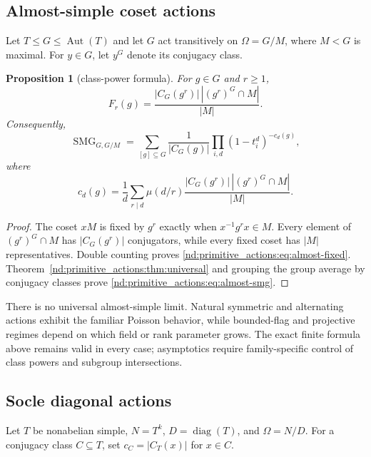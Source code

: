 \documentclass[10pt]{article}
\newcommand{\SMG}{\operatorname{SMG}}
\newcommand{\MGF}{\SMG}
\newtheorem{proposition}{Proposition}
\begin{document}
\subsection{Almost-simple coset actions}

Let $T\le G\le\operatorname{Aut}(T)$ and let $G$ act transitively on
$\Omega=G/M$, where $M<G$ is maximal.  For $y\in G$, let $y^G$ denote its
conjugacy class.

\begin{proposition}[class-power formula]\label{nd:primitive_actions:prop:almost-simple}
For $g\in G$ and $r\ge1$,
\begin{equation}\label{nd:primitive_actions:eq:almost-fixed}
 \boxed{F_r(g)=\frac{|C_G(g^r)|\,|(g^r)^G\cap M|}{|M|}.}
\end{equation}
Consequently,
\begin{equation}\label{nd:primitive_actions:eq:almost-smg}
 \boxed{\MGF_{G,G/M}=
 \sum_{[g]\subseteq G}\frac1{|C_G(g)|}
 \prod_{i,d}(1-t_i^d)^{-c_d(g)},}
\end{equation}
where
\[
 c_d(g)=\frac1d\sum_{r\mid d}\mu(d/r)
 \frac{|C_G(g^r)|\,|(g^r)^G\cap M|}{|M|}.
\]
\end{proposition}

\begin{proof}
The coset $xM$ is fixed by $g^r$ exactly when $x^{-1}g^rx\in M$.  Every
element of $(g^r)^G\cap M$ has $|C_G(g^r)|$ conjugators, while every fixed
coset has $|M|$ representatives.  Double counting proves
\eqref{nd:primitive_actions:eq:almost-fixed}.  Theorem~\ref{nd:primitive_actions:thm:universal} and grouping the group
average by conjugacy classes prove \eqref{nd:primitive_actions:eq:almost-smg}.
\end{proof}

There is no universal almost-simple limit.  Natural symmetric and alternating
actions exhibit the familiar Poisson behavior, while bounded-flag and
projective regimes depend on which field or rank parameter grows.  The exact
finite formula above remains valid in every case; asymptotics require
family-specific control of class powers and subgroup intersections.

\subsection{Socle diagonal actions}

Let $T$ be nonabelian simple, $N=T^k$, $D=\operatorname{diag}(T)$, and
$\Omega=N/D$.  For a conjugacy class $C\subseteq T$, set
$c_C=|C_T(x)|$ for $x\in C$.
\end{document}

